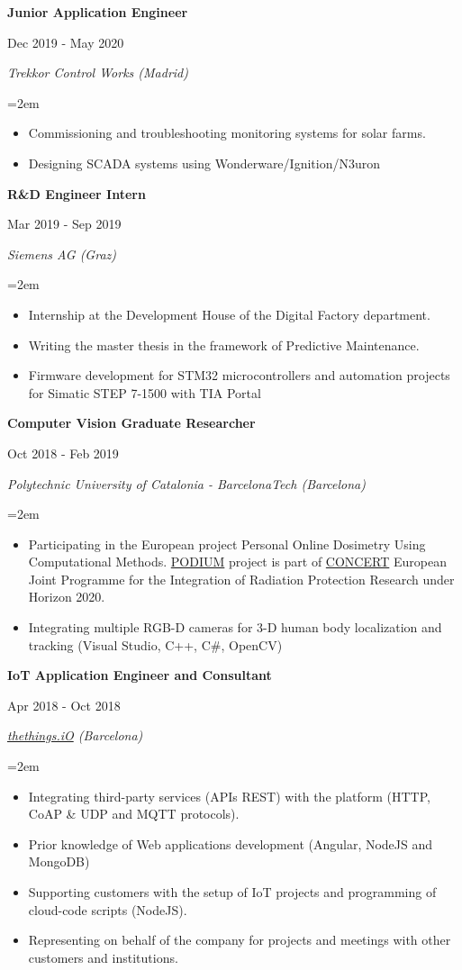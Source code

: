\documentclass[10pt,a4paper,oneside]{book}
\newcommand{\sepspace}{\vspace*{0pt}}		%
\newcommand{\EducationEntrya}[4]{\noindent\ignorespaces	
		\begin{minipage}[t][][b]{0.8\textwidth} \raggedright{\textbf{#1}} \end{minipage} \hfill 
		\begin{minipage}[t][][b]{0.2\textwidth} \hfill\color{Black}#2\end{minipage} 
		 
		\noindent \textit{#3} \par        %
		\noindent\hangindent=2em\hangafter=0 \small #4 
		\normalsize \par}
\begin{document}
\EducationEntrya{Junior Application Engineer}{Dec 2019 - May 2020}{Trekkor Control Works (Madrid)}{\begin{itemize}
    \item Commissioning and troubleshooting monitoring systems for solar farms.
    \item Designing SCADA systems using Wonderware/Ignition/N3uron
\end{itemize}}
\sepspace

\EducationEntrya{R\&D Engineer Intern}{Mar 2019 - Sep 2019}{Siemens AG (Graz)}{\begin{itemize} 
\item Internship at the Development House of the Digital Factory department. 
\item Writing the master thesis in the framework of Predictive Maintenance.
\item Firmware development for STM32 microcontrollers and automation projects for Simatic STEP 7-1500 with TIA Portal\end{itemize}}
\sepspace

\EducationEntrya{Computer Vision Graduate Researcher}{Oct 2018 - Feb 2019}{Polytechnic University of Catalonia - BarcelonaTech (Barcelona)}{\begin{itemize} 
\item Participating in the European project Personal Online Dosimetry Using Computational Methods. \href{https://podium-concerth2020.eu}{PODIUM} project is part of \href{http://www.concert-h2020.eu/}{CONCERT} European Joint Programme for the Integration of Radiation Protection Research under Horizon 2020.
\item Integrating multiple RGB-D cameras for 3-D human body localization and tracking (Visual Studio, C++, C\#, OpenCV)
\end{itemize}}
\sepspace

\EducationEntrya{IoT Application Engineer and Consultant}{Apr 2018 - Oct 2018}{\href{https://thethings.io/}{thethings.iO} (Barcelona)}{\begin{itemize} 
\item Integrating third-party services (APIs REST) with the platform (HTTP, CoAP \& UDP and MQTT protocols).
\item Prior knowledge of Web applications development (Angular, NodeJS and MongoDB)
\item Supporting customers with the setup of IoT projects and programming of cloud-code scripts (NodeJS).
\item Representing on behalf of the company for projects and meetings with other customers and institutions.
\end{itemize}}
\sepspace
\end{document}
